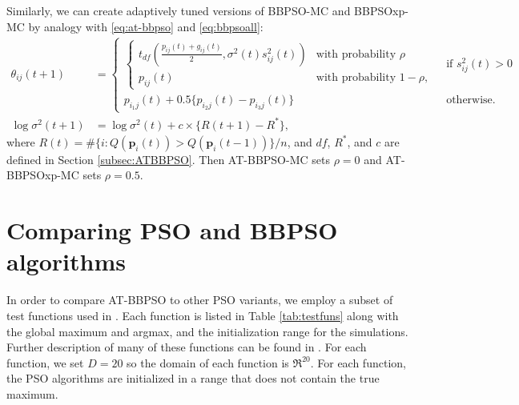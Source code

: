 \documentclass[12pt]{article}
\begin{document}
Similarly, we can create adaptively tuned versions of BBPSO-MC and BBPSOxp-MC by analogy with \eqref{eq:at-bbpso} and \eqref{eq:bbpsoall}:
\begin{align*}%
\theta_{ij}(t+1) &= 
  \begin{cases} 
    \begin{cases} t_{df}\left(\frac{p_{ij}(t) + g_{ij}(t)}{2}, \sigma^2(t)s^2_{ij}(t)\right) & \mbox{with probability } \rho\\
      p_{ij}(t) & \mbox{with probability } 1 - \rho,
    \end{cases}
    & \mbox{ if } s^2_{ij}(t) > 0\\
    p_{i_1j}(t) + 0.5\{p_{i_2j}(t) - p_{i_3j}(t)\} & \mbox{ otherwise.}
  \end{cases}\\
\log\sigma^2(t+1) &= \log\sigma^2(t) + c\times\{R(t+1) - R^*\},
\end{align*}
where $R(t)=\#\{i:Q(\bm{p}_i(t))> Q(\bm{p}_i(t-1))\}/n$, and $df$, $R^*$, and $c$ are defined in Section \ref{subsec:ATBBPSO}. Then AT-BBPSO-MC sets $\rho=0$ and AT-BBPSOxp-MC sets $\rho=0.5$.

\section{Comparing PSO and BBPSO algorithms}\label{app:psocompare}
In order to compare AT-BBPSO to other PSO variants, we employ a subset of test functions used in \citet{hsieh2010modified}. Each function is listed in Table \ref{tab:testfuns} along with the global maximum and argmax, and the initialization range for the simulations. Further description of many of these functions can be found in \citet{clerc2010particle}. For each function, we set $D=20$ so the domain of each function is $\Re^{20}$. For each function, the PSO algorithms are initialized in a range that does not contain the true maximum.
\end{document}
